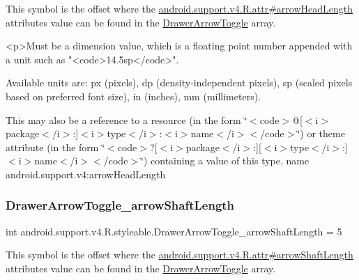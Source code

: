 This symbol is the offset where the \hyperlink{classandroid_1_1support_1_1v4_1_1R_1_1attr_a2e623c2b4980c56bac06c3ec52a679e5}{android.\+support.\+v4.\+R.\+attr\#arrow\+Head\+Length} attribute\textquotesingle{}s value can be found in the \hyperlink{classandroid_1_1support_1_1v4_1_1R_1_1styleable_af08d693b5d7faf0f18822ffe29c6028c}{Drawer\+Arrow\+Toggle} array.

\begin{DoxyVerb}      <p>Must be a dimension value, which is a floating point number appended with a unit such as "<code>14.5sp</code>".
\end{DoxyVerb}
 Available units are\+: px (pixels), dp (density-\/independent pixels), sp (scaled pixels based on preferred font size), in (inches), mm (millimeters). 

This may also be a reference to a resource (in the form \char`\"{}$<$code$>$@\mbox{[}$<$i$>$package$<$/i$>$\+:\mbox{]}$<$i$>$type$<$/i$>$\+:$<$i$>$name$<$/i$>$$<$/code$>$\char`\"{}) or theme attribute (in the form \char`\"{}$<$code$>$?\mbox{[}$<$i$>$package$<$/i$>$\+:\mbox{]}\mbox{[}$<$i$>$type$<$/i$>$\+:\mbox{]}$<$i$>$name$<$/i$>$$<$/code$>$\char`\"{}) containing a value of this type.  name android.\+support.\+v4\+:arrow\+Head\+Length \mbox{\label{classandroid_1_1support_1_1v4_1_1R_1_1styleable_ab53d0e29cd65acb145c6d9782b331b94}} 
\subsubsection{\texorpdfstring{Drawer\+Arrow\+Toggle\+\_\+arrow\+Shaft\+Length}{DrawerArrowToggle\_arrowShaftLength}}
{\footnotesize\ttfamily int android.\+support.\+v4.\+R.\+styleable.\+Drawer\+Arrow\+Toggle\+\_\+arrow\+Shaft\+Length = 5\hspace{0.3cm}{\ttfamily [static]}}

This symbol is the offset where the \hyperlink{classandroid_1_1support_1_1v4_1_1R_1_1attr_a5b8710bfc0b35653f4f7cc097e377dfc}{android.\+support.\+v4.\+R.\+attr\#arrow\+Shaft\+Length} attribute\textquotesingle{}s value can be found in the \hyperlink{classandroid_1_1support_1_1v4_1_1R_1_1styleable_af08d693b5d7faf0f18822ffe29c6028c}{Drawer\+Arrow\+Toggle} array.

